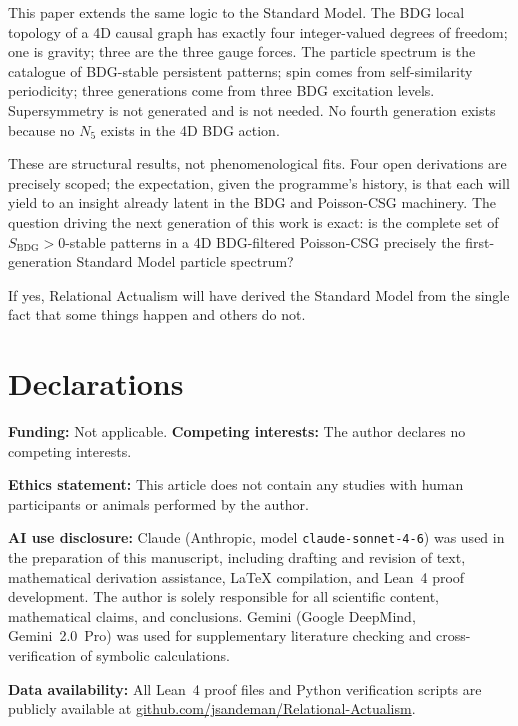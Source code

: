 \documentclass[11pt,a4paper]{article}
\newcommand{\SBDG}{S_{\mathrm{BDG}}}
\begin{document}
This paper extends the same logic to the Standard Model. The BDG local
topology of a 4D causal graph has exactly four integer-valued degrees of
freedom; one is gravity; three are the three gauge forces. The particle
spectrum is the catalogue of BDG-stable persistent patterns; spin comes from
self-similarity periodicity; three generations come from three BDG excitation
levels. Supersymmetry is not generated and is not needed. No fourth generation
exists because no $N_5$ exists in the 4D BDG action.

These are structural results, not phenomenological fits. Four open derivations
are precisely scoped; the expectation, given the programme's history, is that
each will yield to an insight already latent in the BDG and Poisson-CSG
machinery. The question driving the next generation of this work is exact:
is the complete set of $\SBDG > 0$-stable patterns in a 4D BDG-filtered
Poisson-CSG precisely the first-generation Standard Model particle spectrum?

If yes, Relational Actualism will have derived the Standard Model from the
single fact that some things happen and others do not.


\section*{Declarations}
\textbf{Funding:} Not applicable.\quad
\textbf{Competing interests:} The author declares no competing interests.

\textbf{Ethics statement:} This article does not contain any studies with human participants or animals performed by the author.

\textbf{AI use disclosure:} Claude (Anthropic, model \texttt{claude-sonnet-4-6}) was used in the preparation of this manuscript, including drafting and revision of text, mathematical derivation assistance, \LaTeX{} compilation, and Lean~4 proof development. The author is solely responsible for all scientific content, mathematical claims, and conclusions. Gemini (Google DeepMind, Gemini~2.0~Pro) was used for supplementary literature checking and cross-verification of symbolic calculations.

\textbf{Data availability:} All Lean~4 proof files and Python verification scripts are publicly available at \href{https://github.com/jsandeman/Relational-Actualism}{github.com/jsandeman/Relational-Actualism}.
\end{document}
